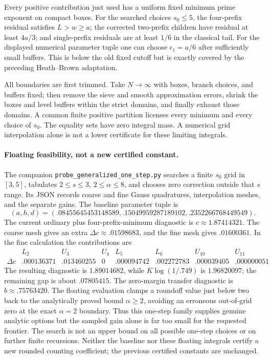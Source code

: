 \documentclass[11pt]{article}
\begin{document}
Every positive contribution just used has a uniform fixed minimum
prime exponent on compact boxes. For the searched choices $s_0\le5$,
the four-prefix residual satisfies $L>w\ge a$; the corrected
two-prefix children have residual at least $4a/3$; and single-prefix
residuals are at least $1/6$ in the classical tail. For the displayed
numerical parameter tuple one can choose $\epsilon_1=a/6$ after
sufficiently small buffers. This is below the old fixed cutoff but
is exactly covered by the preceding Heath--Brown adaptation.

All boundaries are first trimmed. Take $N\to\infty$ with boxes,
branch choices, and buffers fixed; then remove the sieve and smooth
approximation errors, shrink the boxes and level buffers within the
strict domains, and finally exhaust those domains. A common finite
positive partition licenses every minimum and every choice of
$s_0$. The equality sets have zero integral mass. A numerical grid
interpolation alone is not a lower certificate for these limiting
integrals.

\paragraph{Floating feasibility, not a new certified constant.}
The companion \texttt{probe\_generalized\_one\_step.py} searches a finite
$s_0$ grid in $[3,5]$, tabulates $2\le s\le3$, $2\le\alpha\le8$,
and chooses zero correction outside that $s$ range. Its JSON records
coarse and fine Gauss quadratures, interpolation meshes, and the
separate gains. The baseline parameter tuple is
\[
 (a,h,d)=(.08455645453148589,.15049959287189102,
                           .2352266768449549).
\]
The current ordinary plus four-prefix-minimum diagnostic is
$c\approx1.87414321$. The coarse mesh gives an extra
$\Delta c\approx .01598683$, and the fine mesh gives $.01600361$.
In the fine calculation the contributions are
\[
\begin{array}{c|rrrrrrr}
 &L_2&U_3&U_4&L_5&L_6&U_{10}&U_{11}\\\hline
 \Delta c&.000136371&.013460255&0&.000094742&.002272783&
 .000039405&.000000051
\end{array}
\]
The resulting diagnostic is $1.89014682$, while $K\log(1/.749)$
is $1.96820097$; the remaining gap is about $.07805415$.
The zero-margin transfer diagnostic is $b\approx .75763420$.
The floating evaluation clamps a roundoff value just below two back
to the analytically proved bound $\alpha\ge2$, avoiding an erroneous
out-of-grid zero at the exact $\alpha=2$ boundary.
Thus this one-step family supplies genuine
analytic options but the sampled gain alone is far too small for
the requested frontier. The search is not an upper bound on all
possible one-step choices or on further finite recursions. Neither
the baseline nor these floating integrals certify a new rounded
counting coefficient; the previous certified constants are unchanged.
\end{document}
